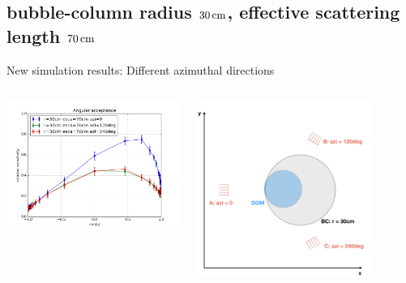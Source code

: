 \subsection{bubble-column radius $30\text{\,cm}$, effective scattering length $70\text{\,cm}$}
\begin{frame}[fragile]{New simulation results: Different azimuthal directions}
  \begin{columns}
    \begin{column}{0.5\textwidth}
      \includegraphics[width=\textwidth]{img/summer_scenario_r30cm_esca70cm}
    \end{column}
    \begin{column}{0.5\textwidth}
      \includegraphics[width=0.8\textwidth]{img/summerscenario-005}
    \end{column}
  \end{columns}


\end{frame}
